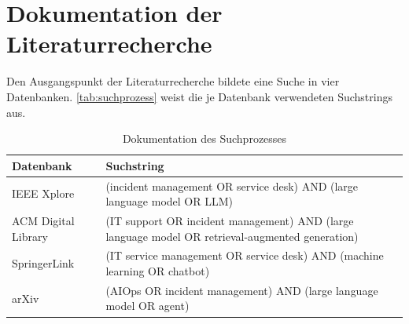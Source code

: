%
%
%
\section{Dokumentation der Literaturrecherche}
\label{anhangLiteraturrecherche}

Den Ausgangspunkt der Literaturrecherche bildete eine Suche in vier Datenbanken. \autoref{tab:suchprozess} weist die je Datenbank verwendeten Suchstrings aus.

\begin{table}[htbp]
	\centering
	\caption{Dokumentation des Suchprozesses}
	\label{tab:suchprozess}
	\begin{tabularx}{\textwidth}{@{}lX@{}}
		\toprule
		Datenbank & Suchstring \\
		\midrule
		IEEE Xplore & (\glqq incident management\grqq{} OR \glqq service desk\grqq{}) AND (\glqq large language model\grqq{} OR LLM) \\
		ACM Digital Library & (\glqq IT support\grqq{} OR \glqq incident management\grqq{}) AND (\glqq large language model\grqq{} OR \glqq retrieval-augmented generation\grqq{}) \\
		SpringerLink & (\glqq IT service management\grqq{} OR \glqq service desk\grqq{}) AND (\glqq machine learning\grqq{} OR chatbot) \\
		arXiv & (\glqq AIOps\grqq{} OR \glqq incident management\grqq{}) AND (\glqq large language model\grqq{} OR agent) \\
		\bottomrule
	\end{tabularx}
\end{table}

